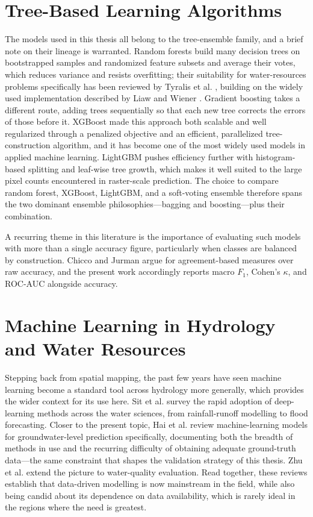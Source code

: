 \section{Tree-Based Learning Algorithms}
\label{sec:lit_algorithms}

The models used in this thesis all belong to the tree-ensemble family, and a
brief note on their lineage is warranted. Random forests build many decision
trees on bootstrapped samples and randomized feature subsets and average their
votes, which reduces variance and resists overfitting; their suitability for
water-resources problems specifically has been reviewed by Tyralis et al.
\cite{tyralis2019randomforests}, building on the widely used implementation
described by Liaw and Wiener \cite{liaw2007randomforest}. Gradient boosting takes
a different route, adding trees sequentially so that each new tree corrects the
errors of those before it. XGBoost \cite{chen2016xgboost} made this approach both
scalable and well regularized through a penalized objective and an efficient,
parallelized tree-construction algorithm, and it has become one of the most
widely used models in applied machine learning. LightGBM \cite{ke2017lightgbm}
pushes efficiency further with histogram-based splitting and leaf-wise tree
growth, which makes it well suited to the large pixel counts encountered in
raster-scale prediction. The choice to compare random forest, XGBoost, LightGBM,
and a soft-voting ensemble therefore spans the two dominant ensemble
philosophies---bagging and boosting---plus their combination.

A recurring theme in this literature is the importance of evaluating such models
with more than a single accuracy figure, particularly when classes are balanced
by construction. Chicco and Jurman \cite{chicco2020mcc} argue for agreement-based
measures over raw accuracy, and the present work accordingly reports macro
$F_1$, Cohen's $\kappa$, and ROC-AUC alongside accuracy.

\section{Machine Learning in Hydrology and Water Resources}
\label{sec:lit_ml_hydrology}

Stepping back from spatial mapping, the past few years have seen machine learning
become a standard tool across hydrology more generally, which provides the wider
context for its use here. Sit et al. \cite{sit2020deeplearning} survey the rapid
adoption of deep-learning methods across the water sciences, from rainfall-runoff
modelling to flood forecasting. Closer to the present topic, Hai et al.
\cite{hai2022gwlreview} review machine-learning models for groundwater-level
prediction specifically, documenting both the breadth of methods in use and the
recurring difficulty of obtaining adequate ground-truth data---the same
constraint that shapes the validation strategy of this thesis. Zhu et al.
\cite{zhu2022mlwaterquality} extend the picture to water-quality evaluation. Read
together, these reviews establish that data-driven modelling is now mainstream in
the field, while also being candid about its dependence on data availability,
which is rarely ideal in the regions where the need is greatest.

